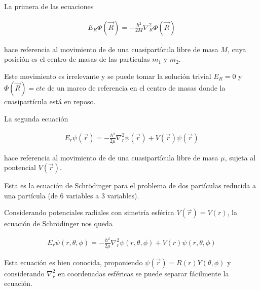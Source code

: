 \begin{frame}{}

    La primera de las ecuaciones 
    
    \begin{align*}
        E_R \Phi ( \Vec{R} ) = - \frac{\hbar^2}{2M} \nabla^{2}_{R}  \Phi ( \Vec{R} )
    \end{align*}
        
    hace referencia al movimiento de de una cuasipartícula libre de masa $M$, cuya posición es el centro de masas de las partículas $m_1$ y $m_2$.
    
    Este movimiento es irrelevante y se puede tomar la solución trivial $E_R = 0$ y $\Phi (\Vec{R}) = cte$ de un marco de referencia en el centro de masas donde la cuasipartícula está en reposo.
    
\end{frame}

\begin{frame}{}

    La segunda ecuación
    
    \begin{align*}
        E_r \psi ( \Vec{r} ) =  - \frac{\hbar^2}{2 \mu } \nabla^{2}_{r} \psi ( \Vec{r} ) + V( \Vec{r} ) \psi ( \Vec{r} )
    \end{align*}
        
    hace referencia al movimiento de de una cuasipartícula libre de masa $\mu$, sujeta al pontencial $V(\Vec{r})$.
    
    \vspace{0.5cm}
    
    Esta es la ecuación de Schr\"odinger para el problema de dos partículas reducida a una partícula (de 6 variables a 3 variables).
    
\end{frame}

\begin{frame}{}

    Considerando potenciales radiales con simetría esférica $V(\Vec{r}) = V(r) $, la ecuación de Schr\"odinger nos queda 
    
    \begin{align*}
        E_r \psi ( r, \theta, \phi ) =  - \frac{\hbar^2}{2 \mu } \nabla^{2}_{r} \psi ( r, \theta, \phi ) + V( r) \psi ( r, \theta, \phi )
    \end{align*}

    Esta ecuación es bien conocida, proponiendo $\psi (\Vec{r}) = R(r) Y( \theta, \phi )$ y considerando $ \nabla^{2}_{r} $ en coordenadas esféricas se puede separar fácilmente la ecuación.
    
\end{frame}

